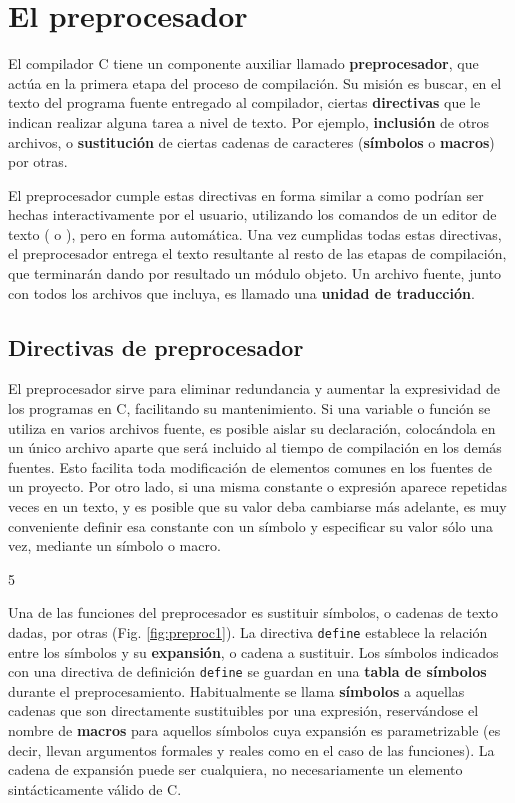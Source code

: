
\chapter{El preprocesador}

El compilador C tiene un componente auxiliar llamado \textbf{preprocesador}, que actúa en la primera etapa del proceso de compilación. Su misión es buscar, en el texto del programa fuente entregado al compilador, ciertas \textbf{directivas} que le indican realizar alguna tarea a nivel de texto. Por ejemplo, \textbf{inclusión} de otros archivos, o \textbf{sustitución} de ciertas cadenas de caracteres (\textbf{símbolos} o \textbf{macros}) por otras. 

El preprocesador cumple estas directivas en forma similar a como podrían ser hechas interactivamente por el usuario, utilizando los comandos de un editor de texto ( o ), pero en forma automática. Una vez cumplidas todas estas directivas, el preprocesador entrega el texto resultante al resto de las etapas de compilación, que terminarán dando por resultado un módulo objeto. Un archivo fuente, junto con todos los archivos que incluya, es llamado una \textbf{unidad de traducción}.

\section{Directivas de preprocesador}

El preprocesador sirve para eliminar redundancia y aumentar la expresividad de los programas en C, facilitando su mantenimiento. Si una variable o función se utiliza en varios archivos fuente, es posible aislar su declaración, colocándola en un único archivo aparte que será incluido al tiempo de compilación en los demás fuentes. Esto facilita toda modificación de elementos comunes en los fuentes de un proyecto. Por otro lado, si una misma constante o expresión aparece repetidas veces en un texto, y es posible que su valor deba cambiarse más adelante, es muy conveniente definir esa constante con un símbolo y especificar su valor sólo una vez, mediante un símbolo o macro.

5
 
Una de las funciones del preprocesador es sustituir símbolos, o cadenas de texto dadas, por otras 
(Fig. \ref{fig:preproc1}). La directiva \texttt{define} establece la relación entre los símbolos y su \textbf{expansión}, o cadena 
a sustituir. Los símbolos indicados con una directiva de definición \texttt{define} se guardan en una \textbf{tabla de símbolos} durante el preprocesamiento. Habitualmente se llama \textbf{símbolos} a aquellas cadenas que son directamente sustituibles por una expresión, reservándose el nombre de \textbf{macros} para aquellos símbolos cuya expansión es parametrizable (es decir, llevan argumentos formales y reales como en el caso de las funciones). La cadena de expansión puede ser cualquiera, no necesariamente un elemento sintácticamente válido de C.

